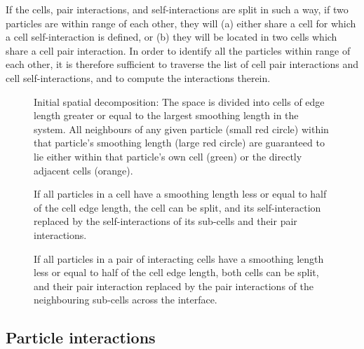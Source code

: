 \documentclass[final]{siamltex}
\begin{document}
If the cells, pair interactions, and self-interactions are split
in such a way, if two particles are within range of each other,
they will (a) either share a cell for which a cell self-interaction
is defined, or (b) they will be located in two cells which share
a cell pair interaction.
In order to identify all the particles within range of each other,
it is therefore sufficient to traverse the list of cell pair
interactions and cell self-interactions, and to compute the
interactions therein.


\begin{figure}[ht]
    \centerline{}
    
    \caption{Initial spatial decomposition: The space is divided into cells of
        edge length greater or equal to the largest smoothing length in the
        system. All neighbours of any given particle (small red circle) within
        that particle's smoothing length (large red circle) are guaranteed to lie
        either within that particle's own cell (green) or the directly
        adjacent cells (orange).}
    \label{fig:InitialDecomp}
\end{figure}


\begin{figure}[ht]
    \centerline{}
    
    \caption{If all particles in a cell have a smoothing length less or equal
        to half of the cell edge length, the cell can be split, and its
        self-interaction replaced by the self-interactions of its sub-cells
        and their pair interactions.}
    \label{fig:SplitCell}
\end{figure}


\begin{figure}[ht]
    \centerline{}
    
    \caption{If all particles in a pair of interacting cells have a smoothing
        length less or equal to half of the cell edge length, both cells can be
        split, and their pair interaction replaced by the pair interactions
        of the neighbouring sub-cells across the interface.}
    \label{fig:SplitPair}
\end{figure}


\subsection{Particle interactions}
\end{document}

